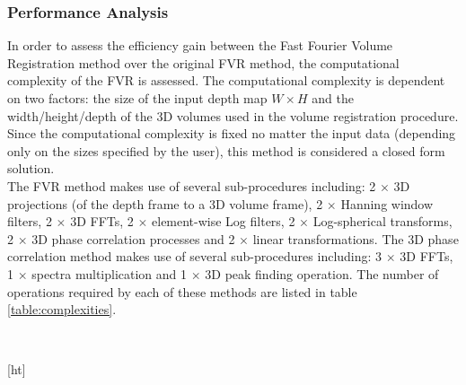 \subsubsection{Performance Analysis}

In order to assess the efficiency gain between the Fast Fourier Volume Registration method over the original FVR method, the computational complexity of the FVR is assessed. The computational complexity is dependent on two factors: the size of the input depth map $W \times H$ and the width/height/depth of the 3D volumes used in the volume registration procedure. Since the computational complexity is fixed no matter the input data (depending only on the sizes specified by the user), this method is considered a closed form solution. \\

The FVR method makes use of several sub-procedures including: 2 $\times$ 3D projections (of the depth frame to a 3D volume frame), 2 $\times$ Hanning window filters, 2 $\times$ 3D FFTs, 2 $\times$ element-wise Log filters, 2 $\times$ Log-spherical transforms, 2 $\times$ 3D phase correlation processes and 2 $\times$ linear transformations. The 3D phase correlation method makes use of several sub-procedures including: 3 $\times$ 3D FFTs, 1 $\times$ spectra multiplication and 1 $\times$ 3D peak finding operation. The number of operations required by each of these methods are listed in table \ref{table:complexities}. \\


\begin{table}[ht]
\centering
{}
\\
\caption{Complexities for given Procedures}
\label{table:complexities}
\end{table}[ht]


